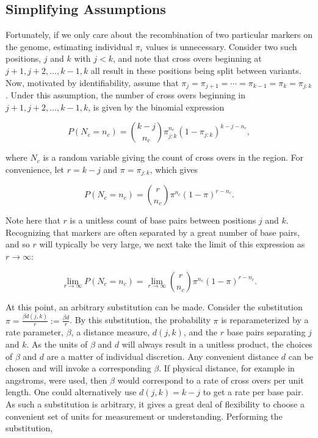 \documentclass{article}
\begin{document}
\subsection{Simplifying Assumptions} \label{subsubsec:simplify}

Fortunately, if we only care about the recombination of two particular markers on the genome, estimating individual $\pi_i$ values is unnecessary. Consider two such positions, $j$ and $k$ with $j < k$, and note that cross overs beginning at $j+1, j+2, \dots, k-1, k$ all result in these positions being split between variants. Now, motivated by identifiability, assume that $\pi_j = \pi_{j+1} = \cdots = \pi_{k-1} = \pi_k = \pi_{j:k}$. Under this assumption, the number of cross overs beginning in $j+1,j+2,\dots,k-1,k$, is given by the binomial expression

$$P(N_c = n_c) = {k - j \choose n_c} \pi_{j:k}^{n_c} (1-\pi_{j:k})^{k - j - n_c},$$

\noindent where $N_c$ is a random variable giving the count of cross overs in the region. For convenience, let $r = k - j$ and $\pi = \pi_{j:k}$, which gives

$$P(N_c = n_c) = {r \choose n_c} \pi^{n_c} (1-\pi)^{r - n_c}.$$

\noindent Note here that $r$ is a unitless count of base pairs between positions $j$ and $k$. Recognizing that markers are often separated by a great number of base pairs, and so $r$ will typically be very large, we next take the limit of this expression as $r \rightarrow \infty$:

$$\lim_{r \rightarrow \infty} P(N_c = n_c) = \lim_{r \rightarrow \infty} {r \choose n_c} \pi^{n_c} (1-\pi)^{r - n_c}.$$

\noindent At this point, an arbitrary substitution can be made. Consider the substitution $\pi = \frac{\beta d(j,k)}{r} := \frac{\beta d}{r}$. By this substitution, the probability $\pi$ is reparameterized by a rate parameter, $\beta$, a distance measure, $d(j,k)$, and the $r$ base pairs separating $j$ and $k$. As the units of $\beta$ and $d$ will always result in a unitless product, the choices of $\beta$ and $d$ are a matter of individual discretion. Any convenient distance $d$ can be chosen and will invoke a corresponding $\beta$. If physical distance, for example in angstroms, were used, then $\beta$ would correspond to a rate of cross overs per unit length. One could alternatively use $d(j,k)=k-j$ to get a rate per base pair. As such a substitution is arbitrary, it gives a great deal of flexibility to choose a convenient set of units for measurement or understanding. Performing the substitution,
\end{document}
